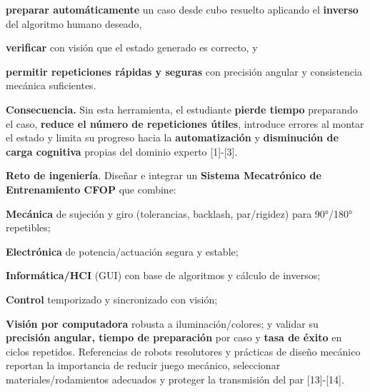 \textbf{preparar automáticamente} un caso desde cubo resuelto aplicando el \textbf{inverso} del algoritmo humano deseado,

\textbf{verificar} con visión que el estado generado es correcto, y

\textbf{permitir repeticiones rápidas y seguras} con precisión angular y consistencia mecánica suficientes.

\textbf{Consecuencia.} Sin esta herramienta, el estudiante \textbf{pierde tiempo} preparando el caso, \textbf{reduce el número de repeticiones útiles}, introduce errores al montar el estado y limita su progreso hacia la \textbf{automatización} y \textbf{disminución de carga cognitiva} propias del dominio experto [1]-[3].

\textbf{Reto de ingeniería}. Diseñar e integrar un \textbf{Sistema Mecatrónico de Entrenamiento CFOP} que combine:

\textbf{Mecánica} de sujeción y giro (tolerancias, backlash, par/rigidez) para 90°/180° repetibles;

\textbf{Electrónica} de potencia/actuación segura y estable;

\textbf{Informática/HCI} (GUI) con base de algoritmos y cálculo de inversos;

\textbf{Control} temporizado y sincronizado con visión;

\textbf{Visión por computadora} robusta a iluminación/colores;
y validar su \textbf{precisión angular, tiempo de preparación} por caso y \textbf{tasa de éxito} en ciclos repetidos. Referencias de robots resolutores y prácticas de diseño mecánico reportan la importancia de reducir juego mecánico, seleccionar materiales/rodamientos adecuados y proteger la transmisión del par [13]-[14].